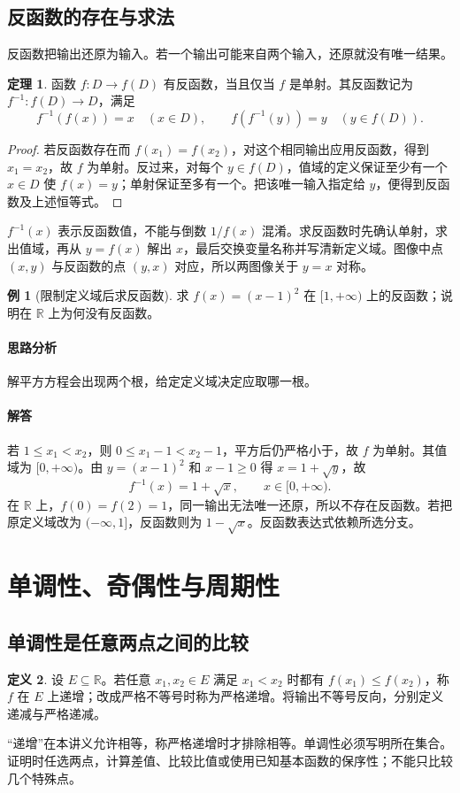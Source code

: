 \documentclass[UTF8,fontset=fandol,12pt,oneside,openany]{ctexrep}
\newcommand{\R}{\mathbb R}
\theoremstyle{definition}
\newtheorem{theorem}{定理}[chapter]
\newtheorem{definition}[theorem]{定义}
\newtheorem{example}{例}[chapter]
\begin{document}
\subsection{反函数的存在与求法}
\label{lec:01:inverse}
反函数把输出还原为输入。若一个输出可能来自两个输入，还原就没有唯一结果。

\begin{theorem}
函数 $f:D\to f(D)$ 有反函数，当且仅当 $f$ 是单射。其反函数记为 $f^{-1}:f(D)\to D$，满足
\[
 f^{-1}(f(x))=x\quad(x\in D),\qquad f(f^{-1}(y))=y\quad(y\in f(D)).
\]
\end{theorem}
\begin{proof}
若反函数存在而 $f(x_1)=f(x_2)$，对这个相同输出应用反函数，得到 $x_1=x_2$，故 $f$ 为单射。反过来，对每个 $y\in f(D)$，值域的定义保证至少有一个 $x\in D$ 使 $f(x)=y$；单射保证至多有一个。把该唯一输入指定给 $y$，便得到反函数及上述恒等式。
\end{proof}
$f^{-1}(x)$ 表示反函数值，不能与倒数 $1/f(x)$ 混淆。求反函数时先确认单射，求出值域，再从 $y=f(x)$ 解出 $x$，最后交换变量名称并写清新定义域。图像中点 $(x,y)$ 与反函数的点 $(y,x)$ 对应，所以两图像关于 $y=x$ 对称。

\begin{example}[限制定义域后求反函数]
求 $f(x)=(x-1)^2$ 在 $[1,+\infty)$ 上的反函数；说明在 $\R$ 上为何没有反函数。
\end{example}
\paragraph{思路分析} 解平方方程会出现两个根，给定定义域决定应取哪一根。
\paragraph{解答} 若 $1\le x_1<x_2$，则 $0\le x_1-1<x_2-1$，平方后仍严格小于，故 $f$ 为单射。其值域为 $[0,+\infty)$。由 $y=(x-1)^2$ 和 $x-1\ge0$ 得 $x=1+\sqrt y$，故
\[
 f^{-1}(x)=1+\sqrt x,\qquad x\in[0,+\infty).
\]
在 $\R$ 上，$f(0)=f(2)=1$，同一输出无法唯一还原，所以不存在反函数。若把原定义域改为 $(-\infty,1]$，反函数则为 $1-\sqrt x$。反函数表达式依赖所选分支。

\section{单调性、奇偶性与周期性}
\label{lec:01:properties}
\subsection{单调性是任意两点之间的比较}
\begin{definition}
设 $E\subseteq\R$。若任意 $x_1,x_2\in E$ 满足 $x_1<x_2$ 时都有 $f(x_1)\le f(x_2)$，称 $f$ 在 $E$ 上递增；改成严格不等号时称为严格递增。将输出不等号反向，分别定义递减与严格递减。
\end{definition}
“递增”在本讲义允许相等，称严格递增时才排除相等。单调性必须写明所在集合。证明时任选两点，计算差值、比较比值或使用已知基本函数的保序性；不能只比较几个特殊点。
\end{document}
